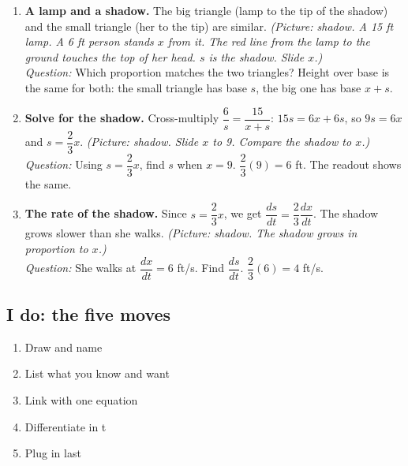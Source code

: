 \documentclass[11pt]{article}
\begin{document}
\begin{enumerate}
\item \textbf{A lamp and a shadow.} The big triangle (lamp to the tip of the shadow) and the small triangle (her to the tip) are similar. \textit{(Picture: shadow. A 15 ft lamp. A 6 ft person stands $x$ from it. The red line from the lamp to the ground touches the top of her head. $s$ is the shadow. Slide $x$.)}\\ \textit{Question:} Which proportion matches the two triangles?  Height over base is the same for both: the small triangle has base $s$, the big one has base $x+s$.
\item \textbf{Solve for the shadow.} Cross-multiply $\dfrac{6}{s}=\dfrac{15}{x+s}$: $15s=6x+6s$, so $9s=6x$ and $s=\dfrac23x$. \textit{(Picture: shadow. Slide $x$ to 9. Compare the shadow to $x$.)}\\ \textit{Question:} Using $s=\dfrac23x$, find $s$ when $x=9$.  $\dfrac23(9)=6$ ft. The readout shows the same.
\item \textbf{The rate of the shadow.} Since $s=\dfrac23x$, we get $\dfrac{ds}{dt}=\dfrac23\dfrac{dx}{dt}$. The shadow grows slower than she walks. \textit{(Picture: shadow. The shadow grows in proportion to $x$.)}\\ \textit{Question:} She walks at $\dfrac{dx}{dt}=6$ ft/s. Find $\dfrac{ds}{dt}$.  $\dfrac23(6)=4$ ft/s.
\end{enumerate}
\subsection*{I do: the five moves}\begin{enumerate}\item Draw and name
\item List what you know and want
\item Link with one equation
\item Differentiate in t
\item Plug in last\end{enumerate}
\end{document}
